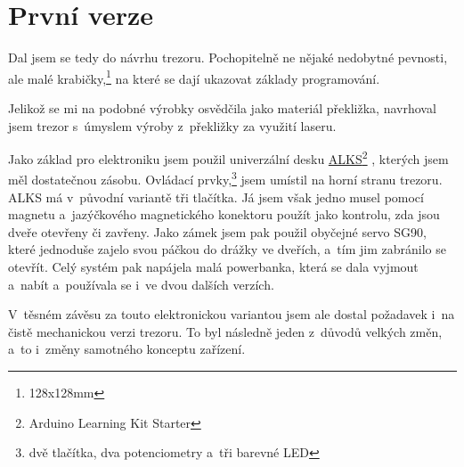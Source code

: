 \section{První verze}
\label{E1-vyvoj}

Dal jsem se tedy do návrhu trezoru. Pochopitelně ne nějaké nedobytné pevnosti, ale malé
krabičky,\footnote{128x128mm} na které se dají ukazovat základy programování. 

Jelikož se mi na podobné výrobky osvědčila jako materiál překližka, navrhoval jsem trezor s~úmyslem výroby z~překližky za využití laseru. 

Jako základ pro elektroniku  jsem použil univerzální 
desku \href{https://github.com/RoboticsBrno/ArduinoLearningKitStarter}{ALKS}\footnote{Arduino Learning Kit Starter} \parencite{ALKS}, 
kterých jsem měl dostatečnou zásobu. Ovládací prvky,\footnote{dvě tlačítka, dva potenciometry a~tři barevné LED} jsem umístil na horní stranu trezoru. 
ALKS má v~původní variantě tři tlačítka. Já jsem však jedno musel pomocí magnetu a~jazýčkového magnetického konektoru použít
jako kontrolu, zda jsou dveře otevřeny či zavřeny. %
Jako zámek jsem pak použil obyčejné servo
SG90, které jednoduše zajelo svou páčkou do drážky ve dveřích, a~tím jim zabránilo 
se otevřít. Celý systém pak napájela malá powerbanka, která se dala vyjmout a~nabít  
a~používala se i~ve dvou dalších verzích.


V~těsném závěsu za touto elektronickou variantou jsem ale dostal poža\-da\-vek i~na čistě mechanickou verzi trezoru. 
To byl následně jeden z~důvodů velkých změn, a~to i~změny samotného konceptu zařízení.